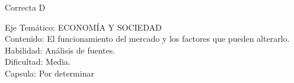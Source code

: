 \documentclass[letterpaper,11pt]{article}
\newcommand{\anchopregunta}{0.9\textwidth}
\begin{document}
\begin{enumerate}
\begin{minipage}{\anchopregunta}
\begin{key}
\end{key} 
\begin{hint}
\end{hint}
\begin{answer} Correcta D \\
\end{answer}
\begin{info} %
\begin{flushleft}
Eje Temático: ECONOMÍA Y SOCIEDAD\\
Contenido: El funcionamiento del mercado y los factores que pueden alterarlo.\\
Habilidad: Análisis de fuentes.\\
Dificultad: Media.\\
Capsula: Por determinar \\
\end{flushleft} 
\end{info}
\end{minipage}\vfill$\;$ %


\end{enumerate}
\end{document}
